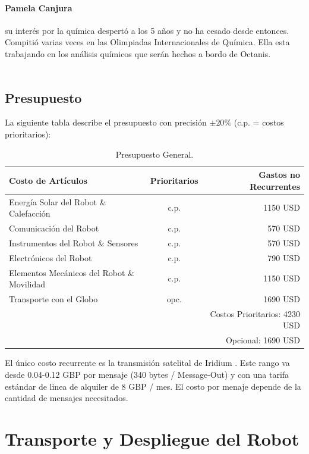 \documentclass[a4paper,12pt]{article}
\begin{document}
\paragraph{Pamela Canjura}  su interés por la química despertó a los 5 años y no ha cesado desde entonces. Compitió varias veces en las Olimpiadas Internacionales de Química. Ella esta trabajando en los análisis químicos que serán hechos a bordo de Octanis.
\\ \\


\subsection{Presupuesto}

La siguiente tabla describe el presupuesto con precisión $\pm 20\%$ (c.p. = costos prioritarios): \\ 

\begin{table}[h!]
\centering
\begin{tabular}{ l | c || r }
  Costo de Artículos & Prioritarios & Gastos no Recurrentes \\
  \hline
  Energía Solar del Robot \& Calefacción & c.p. & 1150 USD \\
  Comunicación del Robot & c.p. & 570 USD \\
  Instrumentos del Robot \& Sensores & c.p. & 570 USD \\
  Electrónicos del Robot & c.p. & 790 USD \\
  Elementos Mecánicos del Robot \& Movilidad & c.p. & 1150 USD \\
  Transporte con el Globo & opc. & 1690 USD \\
  \hline \hline
  & & Costos Prioritarios: 4230 USD  \\
  & & Opcional: 1690 USD \\
\end{tabular}
\caption{Presupuesto General.}
\end{table}


El único costo recurrente es la transmisión satelital de Iridium \cite{iridium}. Este rango va desde 0.04-0.12 GBP por mensaje (340 bytes / Message-Out) y con una tarifa estándar de linea de alquiler de 8 GBP / mes. El costo por menaje depende de la cantidad de mensajes necesitados.



\section{Transporte y Despliegue del Robot}
\end{document}
